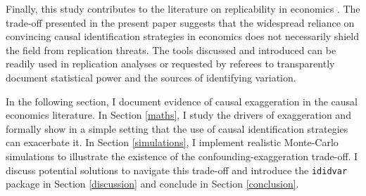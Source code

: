 			Finally, this study contributes to the literature on replicability in economics \citep{camerer_evaluating_2016, ioannidis_power_2017, christensen_transparency_2018, kasy_forking_2021}. The trade-off presented in the present paper suggests that the widespread reliance on convincing causal identification strategies in economics does not necessarily shield the field from replication threats. The tools discussed and introduced can be readily used in replication analyses or requested by referees to transparently document statistical power and the sources of identifying variation.
			
			In the following section, I document evidence of causal exaggeration in the causal  economics literature. In Section \ref{maths}, I study the drivers of exaggeration and formally show in a simple setting that the use of causal identification strategies can exacerbate it. In Section  \ref{simulations}, I implement realistic Monte-Carlo simulations to illustrate the existence of the confounding-exaggeration trade-off. I discuss potential solutions to navigate this trade-off and introduce the \verb?ididvar? package in Section \ref{discussion} and conclude in Section \ref{conclusion}.
	
	
		